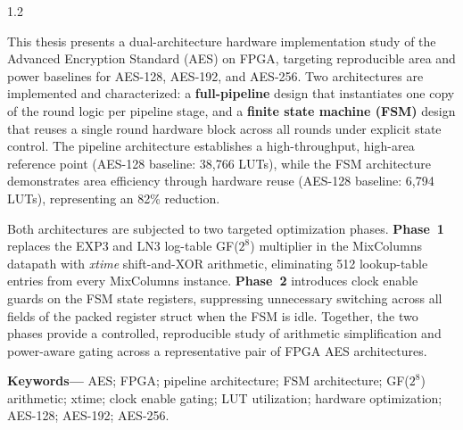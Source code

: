 \begin{center}
\begin{minipage}{0.92\textwidth}
\begin{spacing}{1.2}
{\large
This thesis presents a dual-architecture hardware implementation study of the Advanced
Encryption Standard (AES) on FPGA, targeting reproducible area and power baselines for
AES-128, AES-192, and AES-256. Two architectures are implemented and characterized: a
\textbf{full-pipeline} design that instantiates one copy of the round logic per pipeline
stage, and a \textbf{finite state machine (FSM)} design that reuses a single round hardware
block across all rounds under explicit state control. The pipeline architecture establishes a
high-throughput, high-area reference point (AES-128 baseline: 38,766 LUTs), while the FSM
architecture demonstrates area efficiency through hardware reuse (AES-128 baseline: 6,794
LUTs), representing an 82\% reduction.

Both architectures are subjected to two targeted optimization phases. \textbf{Phase~1}
replaces the EXP3 and LN3 log-table GF($2^{8}$) multiplier in the MixColumns datapath
with \textit{xtime} shift-and-XOR arithmetic, eliminating 512 lookup-table entries from
every MixColumns instance. \textbf{Phase~2} introduces clock enable guards on the FSM
state registers, suppressing unnecessary switching across all fields of the packed register
struct when the FSM is idle. Together, the two phases provide a controlled,
reproducible study of arithmetic simplification and power-aware gating across a
representative pair of FPGA AES architectures.
}
\end{spacing}
\end{minipage}
\end{center}

\vspace{0.8cm}
\noindent\textbf{Keywords---} AES; FPGA; pipeline architecture; FSM architecture;
GF($2^{8}$) arithmetic; xtime; clock enable gating; LUT utilization; hardware optimization;
AES-128; AES-192; AES-256.

\cleardoublepage
\tableofcontents

\cleardoublepage
\listoffigures

\cleardoublepage
\listoftables

\cleardoublepage
{}
